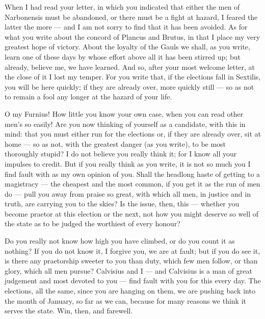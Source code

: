 

 When I had read your letter, in which you indicated that either the men of Narbonensis must be abandoned, or there must be a fight at hazard, I feared the latter the more --- and I am not sorry to find that it has been avoided. As for what you write about the concord of Plancus and Brutus, in that I place my very greatest hope of victory. About the loyalty of the Gauls we shall, as you write, learn one of these days by whose effort above all it has been stirred up; but already, believe me, we have learned. And so, after your most welcome letter, at the close of it I lost my temper. For you write that, if the elections fall in Sextilis, you will be here quickly; if they are already over, more quickly still --- so as not to remain a fool any longer at the hazard of your life.

 O my Furnius! How little you know your own case, when you can read other men's so easily! Are you now thinking of yourself as a candidate, with this in mind: that you must either run for the elections or, if they are already over, sit at home --- so as not, with the greatest danger (as you write), to be most thoroughly stupid? I do not believe you really think it; for I know all your impulses to credit. But if you really think as you write, it is not so much you I find fault with as my own opinion of you. Shall the headlong haste of getting to a magistracy --- the cheapest and the most common, if you get it as the run of men do --- pull you away from praise so great, with which all men, in justice and in truth, are carrying you to the skies? Is the issue, then, this --- whether you become praetor at this election or the next, not how you might deserve so well of the state as to be judged the worthiest of every honour?

 Do you really not know how high you have climbed, or do you count it as nothing? If you do not know it, I forgive you, we are at fault; but if you do see it, is there any praetorship sweeter to you than duty, which few men follow, or than glory, which all men pursue? Calvisius and I --- and Calvisius is a man of great judgement and most devoted to you --- find fault with you for this every day. The elections, all the same, since you are hanging on them, we are pushing back into the month of January, so far as we can, because for many reasons we think it serves the state. Win, then, and farewell.
